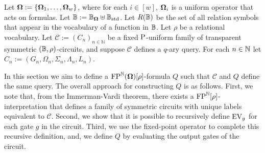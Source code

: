\documentclass[../main/thesis.tex]{subfiles}
\begin{document}
Let $\mathbf{\mathbf{\Omega}} := \{\mathbf{\mathbf{\Omega}}_1, \ldots, \mathbf{\mathbf{\Omega}}_w\}$, where for each $i \in [w]$,
$\mathbf{\mathbf{\Omega}}_i$ is a uniform operator that acts on formulas. Let $\mathbb{B} := \mathbb{B}_{\mathbf{\mathbf{\Omega}}}
\uplus \mathbb{B}_{\text{std}}$. Let $R(\mathbb{B})$ be the set of all relation symbols that appear in the
vocabulary of a function in $\mathbb{B}$. Let $\rho$ be a relational vocabulary. Let
$\mathcal{C} := (C_n)_{n \in \mathbb{N}}$ be a fixed $\mathrm{P}$-uniform family of
transparent symmetric $(\mathbb{B}, \rho)$-circuits, and suppose $\mathcal{C}$ defines
a $q$-ary query. For each $n \in \mathbb{N}$ let $C_n := (G_n, \Omega_n, \Sigma_n,
\Lambda_n, L_n)$.

In this section we aim to define a $\text{\upshape FP}^{\mathbb{N}}(\mathbf{\mathbf{\Omega}})[\rho]$-formula $Q$ such that
$\mathcal{C}$ and $Q$ define the same query. The overall approach for
constructing $Q$ is as follows. First, we note that, from the Immerman-Vardi
theorem, there exists a $\text{\upshape FP}^{\mathbb{N}}[\rho]$-interpretation that defines a family of
symmetric circuits with unique labels equivalent to $\mathcal{C}$. Second, we
show that it is possible to recursively define $\text{EV}_g$ for each gate $g$ in the
circuit. Third, we use the fixed-point operator to complete this recursive
definition, and, we define $Q$ by evaluating the output gates of the circuit.
\end{document}

